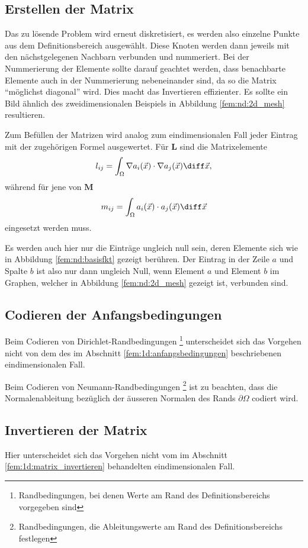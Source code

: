 \subsection{Erstellen der Matrix}
Das zu lösende Problem wird erneut diskretisiert, es werden also einzelne Punkte aus dem Definitionsbereich ausgewählt.
Diese Knoten werden dann jeweils mit den nächstgelegenen Nachbarn verbunden und nummeriert.
Bei der Nummerierung der Elemente sollte darauf geachtet werden, dass benachbarte Elemente auch in der Nummerierung nebeneinander sind, da so die Matrix ``möglichst diagonal'' wird.
Dies macht das Invertieren effizienter.
Es sollte ein Bild ähnlich des zweidimensionalen Beispiels in Abbildung \ref{fem:nd:2d_mesh}
resultieren.

Zum Befüllen der Matrizen wird analog zum eindimensionalen Fall jeder Eintrag mit der zugehörigen Formel ausgewertet.
Für $\mathbf{L}$ sind die Matrixelemente
\begin{equation}
    l_{ij} = \int_{\Omega} \nabla a_i(\vec{x}) \cdot \nabla a_j(\vec{x}) \diff \vec{x},
\end{equation}
während für jene von $\mathbf{M}$ 
\begin{equation}
    m_{ij} = \int_{\Omega} a_i(\vec{x}) \cdot a_j(\vec{x}) \diff \vec{x}
\end{equation}
eingesetzt werden muss.

Es werden auch hier nur die Einträge ungleich null sein, deren Elemente sich wie in Abbildung \ref{fem:nd:basisfkt} gezeigt berühren.
Der Eintrag in der Zeile $a$ und Spalte $b$ ist also nur dann ungleich Null, wenn Element $a$ und Element $b$ im Graphen, welcher in Abbildung \ref{fem:nd:2d_mesh} gezeigt ist, verbunden sind.

\subsection{Codieren der Anfangsbedingungen}
Beim Codieren von Dirichlet-Randbedingungen
\footnote{Randbedingungen, bei denen Werte am Rand des Definitionsbereichs vorgegeben sind}
unterscheidet sich das Vorgehen nicht von dem des im Abschnitt \ref{fem:1d:anfangsbedingungen} beschriebenen eindimensionalen Fall. 

Beim Codieren von Neumann-Randbedingungen 
\footnote{Randbedingungen, die Ableitungswerte am Rand des Definitionsbereichs festlegen}
ist zu beachten, dass die Normalenableitung bezüglich der äusseren Normalen des Rands $\partial \Omega$ codiert wird.

\subsection{Invertieren der Matrix}
Hier unterscheidet sich das Vorgehen nicht vom im Abschnitt \ref{fem:1d:matrix_invertieren} behandelten eindimensionalen Fall.